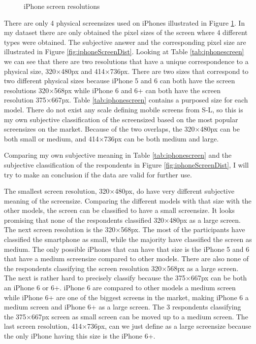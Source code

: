 {{\begin{figure}[H]
{        \label{fig:iphone55}
      }

      \caption{iPhone screen resolutions}
      \label{fig:iphonescreenresolutions}
    \end{figure}

    There are only 4 physical screensizes used on iPhones illustrated in Figure \ref{fig:iphonescreenresolutions}. In my dataset there are only obtained the pixel sizes of the screen where 4 different types were obtained. The subjective answer and the corresponding pixel size are illustrated in Figure \ref{fig:iphoneScreenDist}. Looking at Table \ref{tab:iphonescreen} we can see that there are two resolutions that have a unique correspondence to a physical size, 320$\times$480px  and 414$\times$736px. There are two sizes that correspond to two different physical sizes because iPhone 5 and 6 can both have the screen resolutions 320$\times$568px while iPhone 6 and 6+ can both have the screen resolution 375$\times$667px. Table \ref{tab:iphonescreen} contains a purposed size for each model. There do not exist any scale defining mobile screens from S-L, so this is my own subjective classification of the screensized based on the most popular screensizes on the market. Because of the two overlaps, the 320$\times$480px can be both small or medium, and 414$\times$736px can be both medium and large.

    Comparing my own subjective meaning in Table \ref{tab:iphonescreen} and the subjective classification of the respondents in Figure \ref{fig:iphoneScreenDist}, I will try to make an conclusion if the data are valid for further use. 

    The smallest screen resolution, 320$\times$480px, do have very different subjective meaning of the screensize. Comparing the different models with that size with the other models, the screen can be classified to have a small screensize. It looks promising that none of the respondents classified 320$\times$480px as a large screen. The next screen resolution is the 320$\times$568px. The most of the participants have classified the smartphone as small, while the majority have classified the screen as medium. The only possible iPhones that can have that size is the iPhone 5 and 6 that have a medium screensize compared to other models. There are also none of the respondents classifying the screen resolution 320$\times$568px as a large screen. The next is rather hard to precisely classify because the 375$\times$667px can be both an iPhone 6 or 6+. iPhone 6 are compared to other models a medium screen while iPhone 6+ are one of the biggest screens in the market, making iPhone 6 a medium screen and iPhone 6+ as a large screen. The 3 respondents classifying the 375$\times$667px screen as small screen can be moved up to a medium screen. The last screen resolution, 414$\times$736px, can we just define as a large screensize because the only iPhone having this size is the iPhone 6+. 

}}
